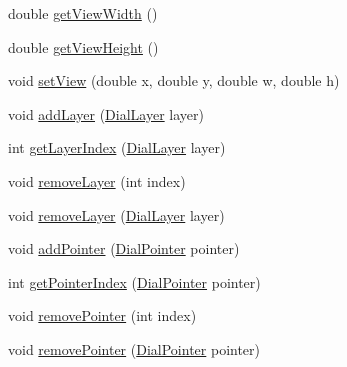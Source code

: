 \begin{DoxyCompactItemize}
\item 
double \mbox{\hyperlink{classorg_1_1jfree_1_1chart_1_1plot_1_1dial_1_1_dial_plot_a5ab34623394c29066755f6d0f9759510}{get\+View\+Width}} ()
\item 
double \mbox{\hyperlink{classorg_1_1jfree_1_1chart_1_1plot_1_1dial_1_1_dial_plot_af906c91830e899e4a55d53defc5275ed}{get\+View\+Height}} ()
\item 
void \mbox{\hyperlink{classorg_1_1jfree_1_1chart_1_1plot_1_1dial_1_1_dial_plot_ac66e780fbd6679eed711805ba1d47d77}{set\+View}} (double x, double y, double w, double h)
\item 
void \mbox{\hyperlink{classorg_1_1jfree_1_1chart_1_1plot_1_1dial_1_1_dial_plot_aba3ac5d84201304097d0c8042aee2d20}{add\+Layer}} (\mbox{\hyperlink{interfaceorg_1_1jfree_1_1chart_1_1plot_1_1dial_1_1_dial_layer}{Dial\+Layer}} layer)
\item 
int \mbox{\hyperlink{classorg_1_1jfree_1_1chart_1_1plot_1_1dial_1_1_dial_plot_ac233dcdea31b7587dddce3afb5f8bd5f}{get\+Layer\+Index}} (\mbox{\hyperlink{interfaceorg_1_1jfree_1_1chart_1_1plot_1_1dial_1_1_dial_layer}{Dial\+Layer}} layer)
\item 
void \mbox{\hyperlink{classorg_1_1jfree_1_1chart_1_1plot_1_1dial_1_1_dial_plot_ab28bf80cee6f33f0744a9f800cc5f704}{remove\+Layer}} (int index)
\item 
void \mbox{\hyperlink{classorg_1_1jfree_1_1chart_1_1plot_1_1dial_1_1_dial_plot_a78e33afca5d422d904cbe8444e41ff3a}{remove\+Layer}} (\mbox{\hyperlink{interfaceorg_1_1jfree_1_1chart_1_1plot_1_1dial_1_1_dial_layer}{Dial\+Layer}} layer)
\item 
void \mbox{\hyperlink{classorg_1_1jfree_1_1chart_1_1plot_1_1dial_1_1_dial_plot_a72b0a538b7ef14a09469463e300e2c13}{add\+Pointer}} (\mbox{\hyperlink{classorg_1_1jfree_1_1chart_1_1plot_1_1dial_1_1_dial_pointer}{Dial\+Pointer}} pointer)
\item 
int \mbox{\hyperlink{classorg_1_1jfree_1_1chart_1_1plot_1_1dial_1_1_dial_plot_a5a81b1630be6358b774aaf63542c9e9c}{get\+Pointer\+Index}} (\mbox{\hyperlink{classorg_1_1jfree_1_1chart_1_1plot_1_1dial_1_1_dial_pointer}{Dial\+Pointer}} pointer)
\item 
void \mbox{\hyperlink{classorg_1_1jfree_1_1chart_1_1plot_1_1dial_1_1_dial_plot_adb34f072b32074b4699a4721589e8d30}{remove\+Pointer}} (int index)
\item 
void \mbox{\hyperlink{classorg_1_1jfree_1_1chart_1_1plot_1_1dial_1_1_dial_plot_af453a3f4e83ec6443c5839bbedea0b0b}{remove\+Pointer}} (\mbox{\hyperlink{classorg_1_1jfree_1_1chart_1_1plot_1_1dial_1_1_dial_pointer}{Dial\+Pointer}} pointer)

\end{DoxyCompactItemize}
